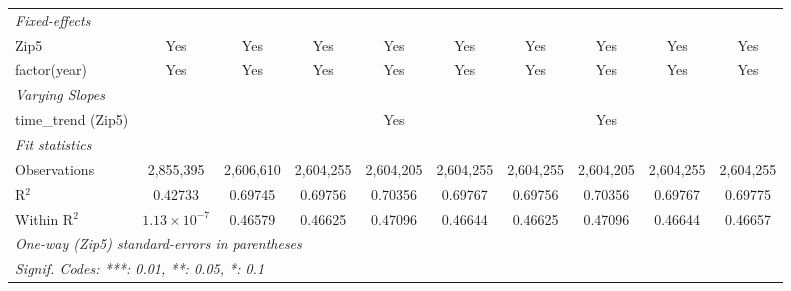 \begin{table}[H]
{\begin{tabular}{lccccccccc}
 \midrule \emph{Fixed-effects}&   &   &   &   &   &   &   &   &  \\ 

 Zip5 & Yes & Yes & Yes & Yes & Yes & Yes & Yes & Yes & Yes\\ 

 factor(year) & Yes & Yes & Yes & Yes & Yes & Yes & Yes & Yes & Yes\\ 

 \midrule \emph{Varying Slopes}&   &   &   &   &   &   &   &   &  \\ 

 time\_trend (Zip5) &  &  &  & Yes &  &  & Yes &  & \\ 

 \midrule \emph{Fit statistics}&  & & & & & & & & \\ 

 Observations & 2,855,395&2,606,610&2,604,255&2,604,205&2,604,255&2,604,255&2,604,205&2,604,255&2,604,255\\ 

 R$^2$ & 0.42733&0.69745&0.69756&0.70356&0.69767&0.69756&0.70356&0.69767&0.69775\\ 

 Within R$^2$ & $1.13\times 10^{-7}$&0.46579&0.46625&0.47096&0.46644&0.46625&0.47096&0.46644&0.46657\\ 

 \midrule\midrule\multicolumn{10}{l}{\emph{One-way (Zip5) standard-errors in parentheses}}\\ 

 \multicolumn{10}{l}{\emph{Signif. Codes: ***: 0.01, **: 0.05, *: 0.1}}\\ 

 \end{tabular}} 

 \end{table} 

  

